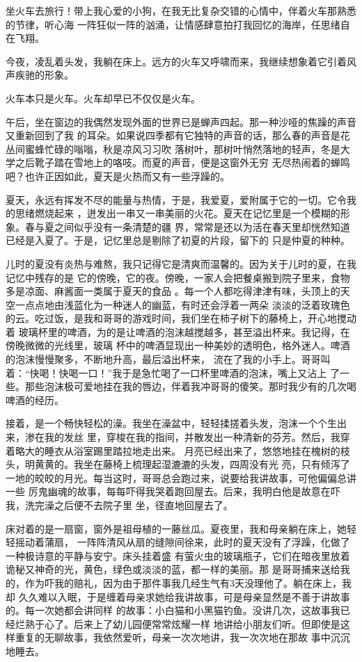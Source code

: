 \documentclass[12pt,a4paper]{article}
\begin{document}
		坐火车去旅行！带上我心爱的小狗，在我无比复杂交错的心情中，伴着火车那熟悉的节律，听心海
	一阵狂似一阵的汹涌，让情感肆意拍打我回忆的海岸，任思绪自在飞翔。

		今夜，凌乱着头发，我躺在床上。远方的火车又呼啸而来，我继续想象着它引着风声疾驰的形象。

		火车本只是火车。火车却早已不仅仅是火车。

	\endwriting



		午后，坐在窗边的我偶然发现外面的世界已是蝉声四起。那一种沙哑的焦躁的声音又重新回到了我
	的耳朵。如果说四季都有它独特的声音的话，那么春的声音是花丛间蜜蜂忙碌的嗡嗡，秋是凉风习习吹
	落树叶，那树叶悄然落地的轻声，冬是大学之后靴子踏在雪地上的咯吱。而夏的声音，便是这窗外无穷
	无尽热闹着的蝉鸣吧？也许正因如此，夏天是火热而又有一些浮躁的。

		夏天，永远有挥发不尽的能量与热情，于是，我爱夏，爱附属于它的一切。它令我的思绪燃烧起来
	，迸发出一串又一串美丽的火花。夏天在记忆里是一个模糊的形象。春与夏之间似乎没有一条清楚的疆
	界，常常是还以为活在春天里却恍然知道已经是入夏了。于是，记忆里总是剔除了初夏的片段，留下的
	只是仲夏的种种。

		儿时的夏没有炎热与难熬，我只记得它是清爽而温馨的。因为关于儿时的夏，在我记忆中残存的是
	它的傍晚，它的夜。傍晚，一家人会把餐桌搬到院子里来，食物多是凉面、麻酱面一类属于夏天的食品
	。每一个人都吃得津津有味，头顶上的天空一点点地由浅蓝化为一种迷人的幽蓝，有时还会浮着一两朵
	淡淡的泛着玫瑰色的云。吃过饭，是我和哥哥的游戏时间，我们坐在柿子树下的藤椅上，开心地搅动着
	玻璃杯里的啤酒，为的是让啤酒的泡沫越搅越多，甚至溢出杯来。我记得，在傍晚微微的光线里，玻璃
	杯中的啤酒显现出一种美妙的透明色，格外迷人。啤酒的泡沫慢慢聚多，不断地升高，最后溢出杯来，
	流在了我的小手上。哥哥叫着：“快喝！快喝一口！”我于是急忙喝了一口杯里啤酒的泡沫，嘴上又沾上
	了一些。那些泡沫极可爱地挂在我的唇边，伴着我冲哥哥的傻笑。那时我少有的几次喝啤酒的经历。

		接着，是一个畅快轻松的澡。我坐在澡盆中，轻轻揉搓着头发，泡沫一个个生出来，渗在我的发丝
	里，穿梭在我的指间，并散发出一种清新的芬芳。然后，我穿着略大的睡衣从浴室踢里踏拉地走出来。
	月亮已经出来了，悠悠地挂在槐树的枝头，明黄黄的。我坐在藤椅上梳理起湿漉漉的头发，四周没有光
	亮，只有倾泻了一地的皎皎的月光。每当这时，哥哥总会跑过来，说要给我讲故事，可他偏偏总讲一些
	厉鬼幽魂的故事，每每吓得我哭着跑回屋去。后来，我明白他是故意在吓我，洗完澡之后便不去院子里
	坐，径直地回屋去了。

		床对着的是一扇窗，窗外是祖母植的一藤丝瓜。夏夜里，我和母亲躺在床上，她轻轻摇动着蒲扇，
	一阵阵清风从扇的缝隙间徐来，此时的夏天没有了浮躁，化做了一种极诗意的平静与安宁。床头挂着盛
	有萤火虫的玻璃瓶子，它们在暗夜里放着诡秘又神奇的光，黄色，绿色或淡淡的蓝，都一样的美丽。那
	是哥哥捕来送给我的，作为吓我的赔礼，因为由于那件事我几经生气有3天没理他了。躺在床上，我却
	久久难以入眠，于是缠着母亲求她给我讲故事，可是母亲显然是不善于讲故事的。每一次她都会讲同样
	的故事：小白猫和小黑猫钓鱼。没讲几次，这故事我已经烂熟于心了。后来上了幼儿园便常常炫耀一样
	地讲给小朋友们听。但即使是这样重复的无聊故事，我依然爱听，母亲一次次地讲，我一次次地在那故
	事中沉沉地睡去。
\end{document}
